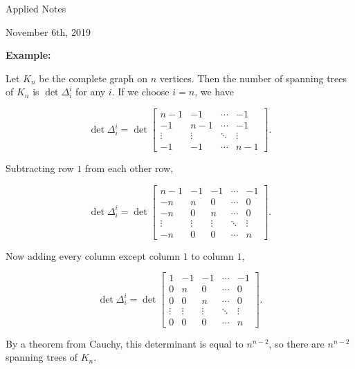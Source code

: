 \documentclass{article}
\theoremstyle{colontheorem}
\newenvironment{Example}
{
	\begin{mdframed}
	\textbf{Example:}%
}
{
	\end{mdframed}
	
	\vspace{.15in}
}
\begin{document}
\vspace*{.5in}

\begin{center}
	\Huge Applied Notes\\
	
	\vspace{.25in}
	
	\Large November 6th, 2019\\
\end{center}

\vspace{.5in}



\begin{Example}
	Let $K_n$ be the complete graph on $n$ vertices. Then the number of spanning trees of $K_n$ is $\det \Delta_i^i$ for any $i$. If we choose $i = n$, we have
	
	$$
		\det \Delta_i^i = \det \begin{bmatrix}
 			n - 1 & -1 & \cdots & -1\\
 			-1 & n - 1 & \cdots & -1\\
 			\vdots & \vdots & \ddots & \vdots\\
 			-1 & -1 & \cdots & n - 1
 		\end{bmatrix}.
	$$
	
	Subtracting row $1$ from each other row,
	
	$$
		\det \Delta_i^i = \det \begin{bmatrix}
 			n - 1 & -1 & -1 & \cdots & -1\\
 			-n & n & 0 & \cdots & 0\\
 			-n & 0 & n & \cdots & 0\\
 			\vdots & \vdots & \vdots & \ddots & \vdots\\
 			-n & 0 & 0 & \cdots & n
 		\end{bmatrix}.
	$$
	
	Now adding every column except column $1$ to column $1$,
	
	$$
		\det \Delta_i^i = \det \begin{bmatrix}
 			1 & -1 & -1 & \cdots & -1\\
 			0 & n & 0 & \cdots & 0\\
 			0 & 0 & n & \cdots & 0\\
 			\vdots & \vdots & \vdots & \ddots & \vdots\\
 			0 & 0 & 0 & \cdots & n
 		\end{bmatrix}.
	$$
	
	By a theorem from Cauchy, this determinant is equal to $n^{n - 2}$, so there are $n^{n - 2}$ spanning trees of $K_n$.
	
\end{Example}
\end{document}

